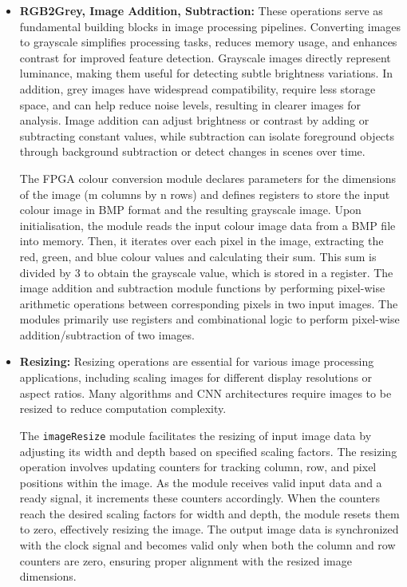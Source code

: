 \begin{itemize}
    \item \textbf{RGB2Grey, Image Addition, Subtraction:} These operations serve as fundamental building blocks in image processing pipelines. Converting images to grayscale simplifies processing tasks, reduces memory usage, and enhances contrast for improved feature detection. Grayscale images directly represent luminance, making them useful for detecting subtle brightness variations. In addition, grey images have widespread compatibility, require less storage space, and can help reduce noise levels, resulting in clearer images for analysis. Image addition can adjust brightness or contrast by adding or subtracting constant values, while subtraction can isolate foreground objects through background subtraction or detect changes in scenes over time. 

    The FPGA colour conversion module declares parameters for the dimensions of the image (m columns by n rows) and defines registers to store the input colour image in BMP format and the resulting grayscale image. Upon initialisation, the module reads the input colour image data from a BMP file into memory. Then, it iterates over each pixel in the image, extracting the red, green, and blue colour values and calculating their sum. This sum is divided by 3 to obtain the grayscale value, which is stored in a register. The image addition and subtraction module functions by performing pixel-wise arithmetic operations between corresponding pixels in two input images. The modules primarily use registers and combinational logic to perform pixel-wise addition/subtraction of two images. 
    
    \item \textbf{Resizing:} Resizing operations are essential for various image processing applications, including scaling images for different display resolutions or aspect ratios. Many algorithms and CNN architectures require images to be resized to reduce computation complexity.

    The \texttt{imageResize} module facilitates the resizing of input image data by adjusting its width and depth based on specified scaling factors. The resizing operation involves updating counters for tracking column, row, and pixel positions within the image. As the module receives valid input data and a ready signal, it increments these counters accordingly. When the counters reach the desired scaling factors for width and depth, the module resets them to zero, effectively resizing the image. The output image data is synchronized with the clock signal and becomes valid only when both the column and row counters are zero, ensuring proper alignment with the resized image dimensions.
    

\end{itemize}
